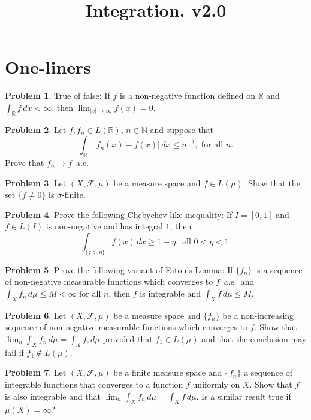 \documentclass[12pt,reqno]{amsart}
\def\field#1{\mathbb{#1}}
\def\abs#1{\lvert {#1} \rvert}
\theoremstyle{definition}
\newtheorem{problem}{Problem}
\theoremstyle{remark}
\begin{document}
\title{Integration. v2.0}
\maketitle

\section{One-liners}
\begin{problem}
  True of false: If $f$ is a non-negative function defined on
  $\field{R}$ and $\int_{\field{R}} f\, dx < \infty$, then
  $\lim_{\abs{x} \to \infty} f(x) = 0$.
\end{problem}
\begin{problem}
  Let $f, f_n \in L(\field{R})$, $n \in \field{N}$ and suppose that
  \begin{equation*}
    \int_{\field{R}} \abs{f_n(x) - f(x)}\, dx \leq n^{-2}, \text{ for
      all } n.
  \end{equation*}
  Prove that $f_n \to f$~a.e.
\end{problem}
\begin{problem}
  Let $(X, \mathcal{F}, \mu)$ be a measure space and $f \in L(\mu)$.
  Show that the set $\{ f \neq 0\}$ is $\sigma$-finite.
\end{problem}
\begin{problem}
  Prove the following Chebychev-like inequality: If $I=[0,1]$ and $f
  \in L(I)$ is non-negative and has integral $1$, then
  \begin{equation*}
    \int_{\{ f > \eta\} } f(x)\, dx \geq 1-\eta, \text{ all } 0< \eta <1.
  \end{equation*}
\end{problem}
\begin{problem}
  Prove the following variant of Fatou's Lemma: If $\{ f_n \}$ is a
  sequence of non-negative measurable functions which converges to
  $f$~a.e.~and $\int_X f_n\, d\mu \leq M < \infty$ for all $n$, then
  $f$ is integrable and $\int_X f\, d\mu \leq M$.
\end{problem}
\begin{problem}
  Let $(X, \mathcal{F}, \mu)$ be a measure space and $\{ f_n \}$ be a
  non-increasing sequence of non-negative measurable functions which
  converges to $f$.  Show that $\lim_n \int_X f_n\, d\mu = \int_X f,
  d\mu$ provided that $f_1 \in L(\mu)$ and that the conclusion may
  fail if $f_1 \not\in L(\mu)$.
\end{problem}
\begin{problem}
  Let $(X, \mathcal{F}, \mu)$ be a finite measure space and $\{ f_n
  \}$ a sequence of integrable functions that converges to a function
  $f$ uniformly on $X$. Show that $f$ is also integrable and that
  $\lim_n \int_X f_n\, d\mu = \int_X f\, d\mu$.  Is a similar result
  true if $\mu(X) = \infty$?
\end{problem}
\end{document}
